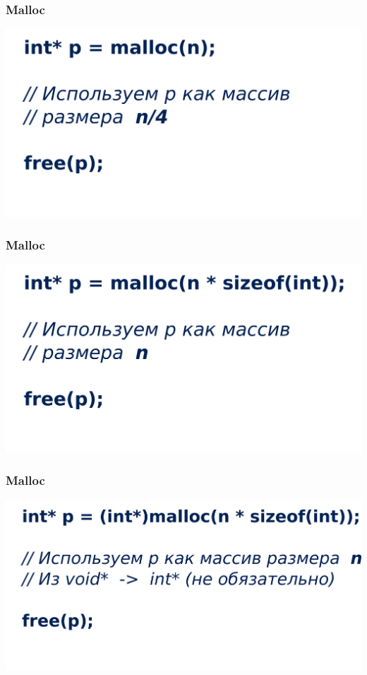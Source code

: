 \documentclass[12pt,pdf,hyperref={unicode}]{beamer}
\begin{document}
\begin{frame}[fragile]
\frametitle{Malloc} 
\begin{center}
\includegraphics[width=1.0\linewidth]{images/malloc_title_1.png}
\end{center}
\end{frame}

\begin{frame}[fragile]
\frametitle{Malloc} 
\begin{center}
\includegraphics[width=1.0\linewidth]{images/malloc_title_2.png}
\end{center}
\end{frame}

\begin{frame}[fragile]
\frametitle{Malloc} 
\begin{center}
\includegraphics[width=1.0\linewidth]{images/malloc_title_3.png}
\end{center}
\end{frame}
\end{document}
